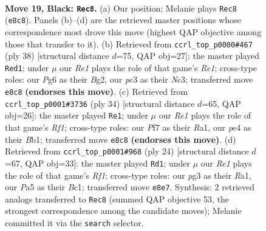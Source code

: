 \documentclass[11pt]{article}
\begin{document}
\clearpage

\begin{figure}[p]\centering
\begin{subfigure}{0.46\textwidth}\centering
\resizebox{\linewidth}{!}{%
\newchessgame
\chessboard[
  setfen={r3r1k1/1bqn1p1p/5bp1/pppPp1B1/4P3/1BP3PN/P4P1P/R1Q1K2R b - - 3 19},
  showmover=false,
  pgfstyle=straightmove, color=movearrow, markmove={e8-c8}
]}
\caption{}
\end{subfigure}\hfill
\begin{subfigure}{0.46\textwidth}\centering
\resizebox{\linewidth}{!}{%
\newchessgame
\chessboard[
  setfen={1r1qr1k1/1pp2pb1/p2pb1p1/4n2p/P1P1PB2/1PN3PP/4QPB1/2R1R1K1 w - - 2 20},
  showmover=false,
  pgfstyle=straightmove, color=movearrow, markmove={e1-d1}
]}
\caption{}
\end{subfigure}
\\[4pt]
\begin{subfigure}{0.46\textwidth}\centering
\resizebox{\linewidth}{!}{%
\newchessgame
\chessboard[
  setfen={2r1k2r/1pqbbpp1/p3p2p/4P2P/1npP4/2B2N2/PP3PP1/RB1Q1RK1 w k - 0 18},
  showmover=false,
  pgfstyle=straightmove, color=movearrow, markmove={f1-e1}
]}
\caption{}
\end{subfigure}\hfill
\begin{subfigure}{0.46\textwidth}\centering
\resizebox{\linewidth}{!}{%
\newchessgame
\chessboard[
  setfen={r2qkb1r/pp3p2/2p1pn2/5p1p/3Pb2P/2P2NP1/PP2QPB1/R1B2RK1 w kq - 1 13},
  showmover=false,
  pgfstyle=straightmove, color=movearrow, markmove={f1-d1}
]}
\caption{}
\end{subfigure}
\caption{\textbf{Move 19, Black: \texttt{Rec8}.} (a) Our position; Melanie plays \texttt{Rec8} (\texttt{e8c8}). Panels (b)--(d) are the retrieved master positions whose correspondence most drove this move (highest QAP objective among those that transfer to it). (b) Retrieved from \texttt{ccrl\_top\_p0000\#467} (ply 38) [structural distance $d$=75, QAP obj=27]: the master played \texttt{Red1}; under $\mu$ our \emph{Re1} plays the role of that game's \emph{Re1}; cross-type roles: our \emph{P}g6 as their \emph{B}g2, our \emph{p}c3 as their \emph{N}c3; transferred move \texttt{e8c8} \textbf{(endorses this move)}. (c) Retrieved from \texttt{ccrl\_top\_p0001\#3736} (ply 34) [structural distance $d$=65, QAP obj=26]: the master played \texttt{Re1}; under $\mu$ our \emph{Re1} plays the role of that game's \emph{Rf1}; cross-type roles: our \emph{P}f7 as their \emph{R}a1, our \emph{p}e4 as their \emph{B}b1; transferred move \texttt{e8c8} \textbf{(endorses this move)}. (d) Retrieved from \texttt{ccrl\_top\_p0001\#968} (ply 24) [structural distance $d$=67, QAP obj=33]: the master played \texttt{Rd1}; under $\mu$ our \emph{Re1} plays the role of that game's \emph{Rf1}; cross-type roles: our \emph{p}g3 as their \emph{R}a1, our \emph{P}a5 as their \emph{B}c1; transferred move \texttt{e8e7}. Synthesis: 2 retrieved analogs transferred to \texttt{Rec8} (summed QAP objective 53, the strongest correspondence among the candidate moves); Melanie committed it via the \texttt{search} selector.}
\label{fig:thought-m37}
\end{figure}
\end{document}
